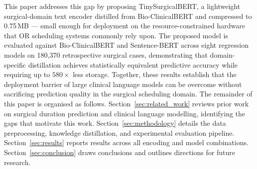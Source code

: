 This paper addresses this gap by proposing TinySurgicalBERT, a lightweight surgical-domain text encoder distilled from Bio-ClinicalBERT and compressed to 0.75\,MB — small enough for deployment on the resource-constrained hardware that OR scheduling systems commonly rely upon. The proposed model is evaluated against Bio-ClinicalBERT and Sentence-BERT across eight regression models on 180{,}370 retrospective surgical cases, demonstrating that domain-specific distillation achieves statistically equivalent predictive accuracy while requiring up to $580\times$ less storage. Together, these results establish that the deployment barrier of large clinical language models can be overcome without sacrificing prediction quality in the surgical scheduling domain. The remainder of this paper is organised as follows. Section~\ref{sec:related_work} reviews prior work on surgical duration prediction and clinical language modelling, identifying the gaps that motivate this work. Section~\ref{sec:methodology} details the data preprocessing, knowledge distillation, and experimental evaluation pipeline. Section~\ref{sec:results} reports results across all encoding and model combinations. Section~\ref{sec:conclusion} draws conclusions and outlines directions for future research.

